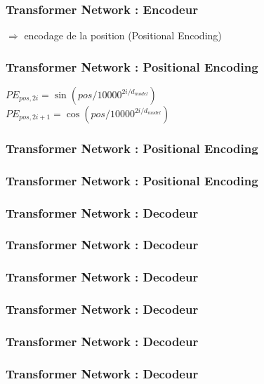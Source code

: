 \begin{frame}
  \frametitle{Transformer Network : Encodeur}

  $\Rightarrow$ encodage de la position (Positional Encoding) \\
\end{frame}

\begin{frame}
  \frametitle{Transformer Network : Positional Encoding}
  $PE_{pos,2i}=\sin{(pos/10000^{2i/d_{model}})}$ \\
  $PE_{pos,2i+1}=\cos{(pos/10000^{2i/d_{model}})}$
\end{frame}

\begin{frame}
  \frametitle{Transformer Network : Positional Encoding}
\end{frame}

\begin{frame}
  \frametitle{Transformer Network : Positional Encoding}
\end{frame}

\begin{frame}
  \frametitle{Transformer Network : Decodeur}
\end{frame}

\begin{frame}
  \frametitle{Transformer Network : Decodeur}
\end{frame}

\begin{frame}
  \frametitle{Transformer Network : Decodeur}
\end{frame}

\begin{frame}
  \frametitle{Transformer Network : Decodeur}
\end{frame}

\begin{frame}
  \frametitle{Transformer Network : Decodeur}
\end{frame}

\begin{frame}
  \frametitle{Transformer Network : Decodeur}
\end{frame}

